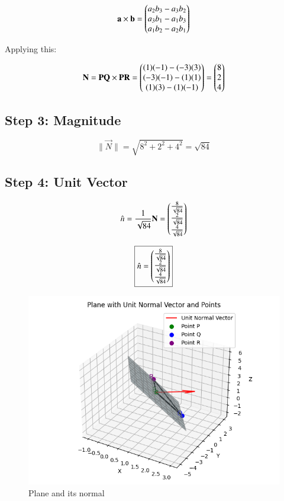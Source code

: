 \documentclass[journal]{IEEEtran}
\begin{document}
\[
\mathbf{a} \times \mathbf{b} = \begin{pmatrix}
a_2 b_3 - a_3 b_2 \\
a_3 b_1 - a_1 b_3 \\
a_1 b_2 - a_2 b_1
\end{pmatrix}
\]



Applying this:


\[
\mathbf{N} = \mathbf{PQ} \times \mathbf{PR} =
\begin{pmatrix}
(1)(-1) - (-3)(3) \\
(-3)(-1) - (1)(1) \\
(1)(3) - (1)(-1)
\end{pmatrix} =
\begin{pmatrix}8 \\ 2 \\ 4\end{pmatrix}
\]



\subsection*{Step 3: Magnitude}


\[
\|\vec{N}\| = \sqrt{8^2 + 2^2 + 4^2} = \sqrt{84}
\]



\subsection*{Step 4: Unit Vector}


\[
\hat{n} = \frac{1}{\sqrt{84}} \mathbf{N}
= \begin{pmatrix}\frac{8}{\sqrt{84}} \\ \frac{2}{\sqrt{84}} \\ \frac{4}{\sqrt{84}}\end{pmatrix}
\]





\[
\boxed{
\hat{n} = \begin{pmatrix}\frac{8}{\sqrt{84}} \\ \frac{2}{\sqrt{84}} \\ \frac{4}{\sqrt{84}}\end{pmatrix}
}
\]










\begin{figure}[H]
    \centering
    \includegraphics[width=1\linewidth]{Figs/fig1.png}
    \caption{Plane and its normal}
    \label{fig:fig1}
\end{figure}
\end{document}
